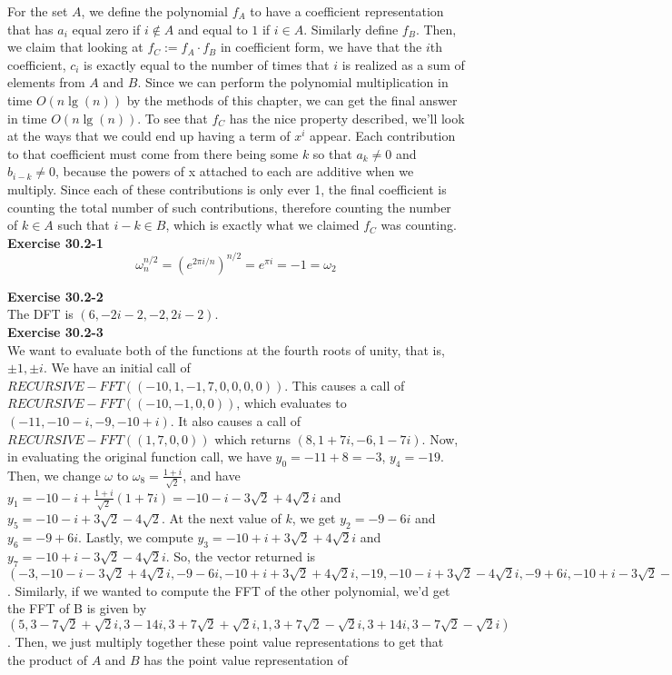 \documentclass{article}
\begin{document}
For the set $A$, we define the polynomial $f_A$ to have a coefficient representation that has $a_i$ equal zero if $i\not\in A$ and equal to $1$ if $i\in A$. Similarly define $f_B$. Then, we claim that looking at $f_C:=f_A \cdot f_B$ in coefficient form, we have that the $i$th coefficient, $c_i$ is exactly equal to the number of times that $i$ is realized as a sum of elements from $A$ and $B$. Since we can perform the polynomial multiplication in time $O(n\lg(n))$ by the methods of this chapter, we can get the final answer in time $O(n\lg(n))$. To see that $f_C$ has the nice property described, we'll look at the ways that we could end up having a term of $x^i$ appear. Each contribution to that coefficient must come from there being some $k$ so that $a_k \neq0$ and $b_{i-k}\neq 0$, because the powers of x attached to each are additive when we multiply. Since each of these contributions is only ever 1, the final coefficient is counting the total number of such contributions, therefore counting the number of $k\in A$ such that $i-k\in B$, which is exactly what we claimed $f_C$ was counting.\\



\noindent\textbf{Exercise 30.2-1}\\

\[
\omega_{n}^{n/2} = \left(e^{2\pi i/n} \right)^{n/2} = e^{\pi i} = -1 = \omega_2
\]

\noindent\textbf{Exercise 30.2-2}\\

The DFT is $(6,-2i-2,-2,2i-2)$.  \\

\noindent\textbf{Exercise 30.2-3}\\

We want to evaluate both of the functions at the fourth roots of unity, that is, $\pm1, \pm i$. We have an initial call of $RECURSIVE-FFT((-10,1,-1,7,0,0,0,0))$. This causes a call of $RECURSIVE-FFT((-10,-1,0,0))$, which evaluates to $(-11,-10-i,-9,-10+i)$. It also causes a call of $ RECURSIVE-FFT((1,7,0,0))$ which returns $(8,1+7i,-6,1-7i)$. Now, in evaluating the original function call, we have $y_0 = -11 +8 = -3$, $y_4 = -19$. Then, we change $\omega$ to $\omega_8 = \frac{1+i}{\sqrt{2}}$, and have $y_1 =-10-i + \frac{1+i}{\sqrt{2}}(1+7i) = -10 -i -3\sqrt{2} + 4\sqrt{2}i$ and $y_5 = -10 -i+ 3\sqrt{2} - 4\sqrt{2}$. At the next value of $k$, we get $y_2 =-9 -6i$ and $y_6 = -9 +6i$. Lastly, we compute $y_3 =-10+i+3\sqrt{2} +4\sqrt{2}i$ and $y_7 = -10+i-3\sqrt{2}-4\sqrt{2} i$. So, the vector returned is $(-3,-10-i-3\sqrt{2} +4\sqrt{2}i,-9-6i,-10+i+3\sqrt{2} +4\sqrt{2}i,-19,-10-i+3\sqrt{2}-4\sqrt{2}i,-9+6i,-10+i-3\sqrt{2}-4\sqrt{2} i)$. Similarly, if we wanted to compute the FFT of the other polynomial, we'd get the FFT of B is given by $(5,3-7\sqrt{2}+ \sqrt{2}i,3-14i,3+7\sqrt{2}+\sqrt{2}i,1,3+7\sqrt{2}-\sqrt{2}i,3+14i, 3-7\sqrt{2}-\sqrt{2}i)$. Then, we just multiply together these point value representations to get that the product of $A$ and $B$ has the point value representation of 
\end{document}

